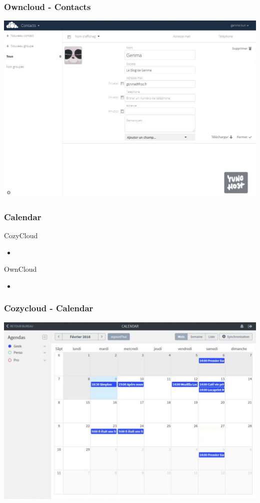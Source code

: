 \documentclass{beamer}
\begin{document}
\begin{frame}
\frametitle{Owncloud - Contacts}
\includegraphics[scale=0.3] {./Owncloud/Owncloud_Contacts.jpg}
\end{frame}

\begin{frame}
\frametitle{Calendar}

\begin{block}{CozyCloud}
\begin{itemize}
\item 
\end{itemize}
\end{block}

\begin{block}{OwnCloud}
\begin{itemize}
\item 
\end{itemize}
\end{block}
\end{frame}

\begin{frame}
\frametitle{Cozycloud - Calendar}
\includegraphics[scale=0.3] {./CozyCloud/CozyCloud_Calendar.jpg}
\end{frame}
\end{document}
